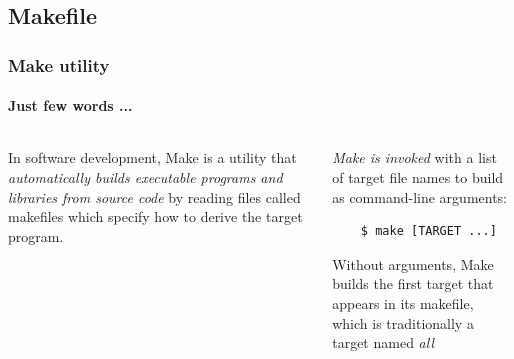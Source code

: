 \documentclass{beamer}
\begin{document}
\subsection{Makefile}
\begin{frame}[fragile]
  \frametitle{Make utility}
  \framesubtitle{Just few words ...}

\begin{columns}
	\begin{column}{6cm}
In software development, \alert{Make is a utility} that \emph{automatically builds executable programs and libraries from source code} by reading files called \alert{makefiles} which specify how to derive the target program. 
	\end{column}
\pause
	\begin{column}{6cm}
\emph{Make is invoked} with a list of \alert{target} file names to build as command-line arguments:
\begin{verbatim}
    $ make [TARGET ...]
\end{verbatim}
Without arguments, Make builds the first target that appears in its makefile, which is traditionally a target named \emph{all}	
	\end{column}
\end{columns}

\end{frame}
\end{document}
